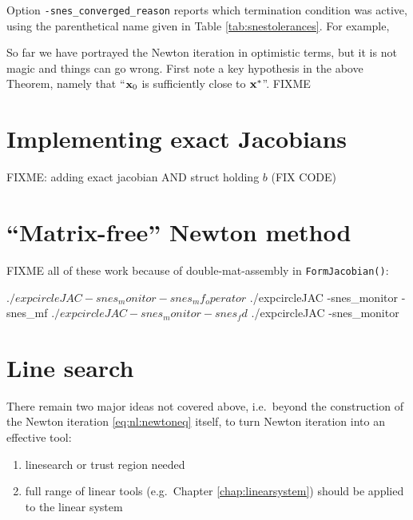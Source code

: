 \medskip
Option \texttt{-snes\_converged\_reason} reports which termination condition was active, using the parenthetical name given in Table \ref{tab:snestolerances}.  For example,

So far we have portrayed the Newton iteration in optimistic terms, but it is not magic and things can go wrong.  First note a key hypothesis in the above Theorem, namely that ``$\mathbf{x}_0$ is sufficiently close to $\mathbf{x}^*$''.  FIXME

\section{Implementing exact Jacobians}

FIXME: adding exact jacobian AND struct holding $b$ (FIX CODE)




\section{``Matrix-free'' Newton method}

FIXME all of these work because of double-mat-assembly in \texttt{FormJacobian()}:

\begin{cline}
$ ./expcircleJAC -snes_monitor -snes_mf_operator
$ ./expcircleJAC -snes_monitor -snes_mf
$ ./expcircleJAC -snes_monitor -snes_fd
$ ./expcircleJAC -snes_monitor
\end{cline}

\section{Line search}

There remain two major ideas not covered above, i.e.~beyond the construction of the Newton iteration \eqref{eq:nl:newtoneq} itself, to turn Newton iteration into an effective tool:
\renewcommand{\labelenumi}{\roman{enumi})}
\begin{enumerate}
\item linesearch or trust region needed \citep{Kelley2003}
\item full range of linear tools (e.g.~Chapter \ref{chap:linearsystem}) should be applied to the linear system
\end{enumerate}

